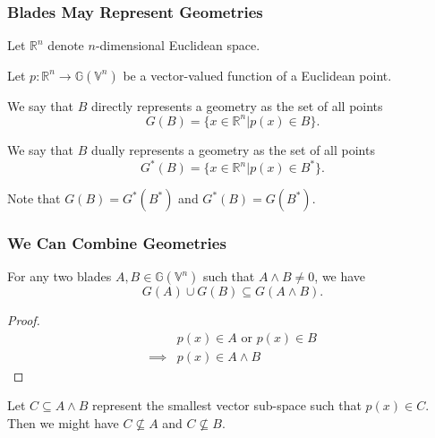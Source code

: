 \documentclass{beamer}
\newcommand{\G}{\mathbb{G}}
\newcommand{\V}{\mathbb{V}}
\newcommand{\R}{\mathbb{R}}
\begin{document}
\begin{frame}
\frametitle{Blades May Represent Geometries}
Let $\R^n$ denote $n$-dimensional Euclidean space.\pause

Let $p:\R^n\to\G(\V^n)$ be a vector-valued function of a Euclidean point.\pause
\begin{definition}
We say that $B$ \alert{directly} represents a geometry as the
set of all points
\begin{equation*}
G(B) = \{x\in\R^n|p(x)\in B\}.
\end{equation*}
\end{definition}\pause
\begin{definition}
We say that $B$ \alert{dually} represents a geometry as the
set of all points
\begin{equation*}
G^*(B) = \{x\in\R^n|p(x)\in B^*\}.
\end{equation*}
\end{definition}\pause
Note that $G(B)=G^*(B^*)$ and $G^*(B)=G(B^*)$.
\end{frame}

\begin{frame}
\frametitle{We Can Combine Geometries}
For any two blades $A,B\in\G(\V^n)$ such that $A\wedge B\neq 0$, we have
\begin{equation*}
G(A)\cup G(B)\subseteq G(A\wedge B).
\end{equation*}\pause
\begin{proof}
\begin{align*}
 & \mbox{$p(x)\in A$ or $p(x)\in B$} \\
\implies & \mbox{$p(x)\in A\wedge B$}
\end{align*}
\end{proof}\pause
Let $C\subseteq A\wedge B$ represent the smallest vector sub-space such that $p(x)\in C$.
Then we might have $C\not\subseteq A$ and $C\not\subseteq B$.
\end{frame}
\end{document}
